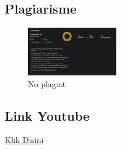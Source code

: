 \subsection{Plagiarisme}
 \begin{figure}[H]
        \includegraphics[width=4cm]{figures/1174021/5/plagiat.png}
        \centering
        \caption{No plagiat}
    \end{figure}

\subsection{Link Youtube}
\href{https://www.youtube.com/watch?v=iYgXYX3VbWw}{Klik Disini}